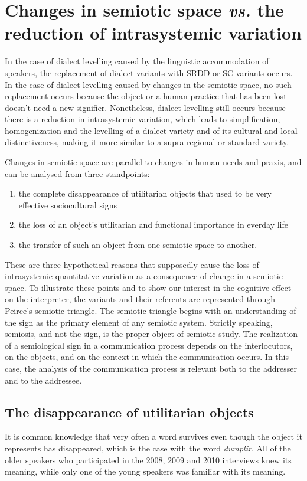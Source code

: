 \documentclass[output=paper]{LSP/langsci}
\begin{document}
\section{Changes in semiotic space \textit{vs.} the reduction of intrasystemic variation}
In the case of dialect levelling caused by the linguistic accommodation of speakers, the replacement of dialect variants with SRDD or SC variants occurs. In the case of dialect levelling caused by changes in the semiotic space, no such replacement occurs because the object or a human practice that has been lost doesn’t need a new signifier. Nonetheless, dialect levelling still occurs because there is a reduction in intrasystemic variation, which leads to simplification, homogenization and the levelling of a dialect variety and of its cultural and local distinctiveness, making it more similar to a supra-regional or standard variety.

Changes in semiotic space are parallel to changes in human needs and praxis, and can be analysed from three standpoints: 

\begin{enumerate}
\item the complete disappearance of utilitarian objects that used to be very effective sociocultural signs 
\item the loss of an object's utilitarian and functional importance in everday life
\item the transfer of such an object from one semiotic space to another.
\end{enumerate}

These are three hypothetical reasons that supposedly cause the loss of intrasystemic quantitative variation as a consequence of change in a semiotic space. To illustrate these points and to show our interest in the cognitive effect on the interpreter, the variants and their referents are represented through Peirce's semiotic triangle. The semiotic triangle begins with an understanding of the sign as the primary element of any semiotic system. Strictly speaking, semiosis, and not the sign, is the proper object of semiotic study. The realization of a semiological sign in a communication process depends on the interlocutors, on the objects, and on the context in which the communication occurs. In this case, the analysis of the communication process is relevant both to the addresser and to the addressee. 

\subsection{The disappearance of utilitarian objects}
It is common knowledge that very often a word survives even though the object it represents has disappeared, which is the case with the word \textit{dumplir}. All of the older speakers who participated in the 2008, 2009 and 2010 interviews knew its meaning, while only one of the young speakers was familiar with its meaning.
\end{document}
